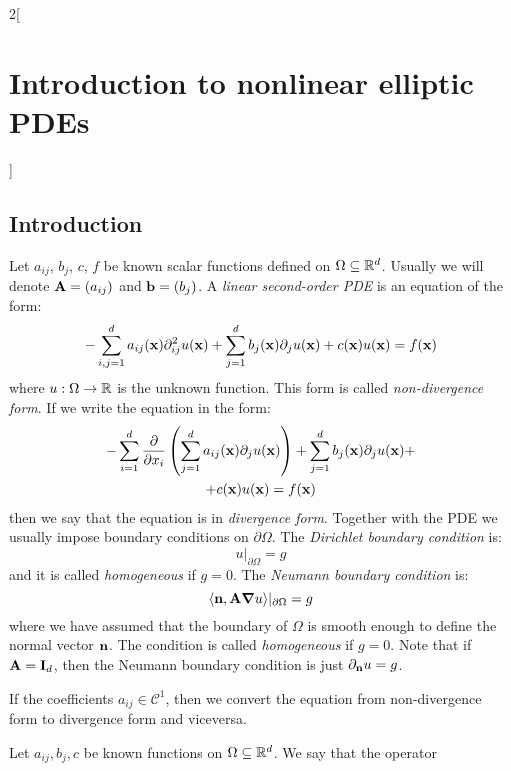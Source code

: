 \documentclass[../../../main_math.tex]{subfiles}
\begin{document}
\begin{multicols}{2}[\section{Introduction to nonlinear elliptic PDEs}]
  \subsection{Introduction}
  \begin{definition}
    Let $a_{ij}$, $b_j$, $c$, $f$ be known scalar functions defined on $\Omega\subseteq \mathbb{R}^d$. Usually we will denote $\boldsymbol{\mathrm{A}}=(a_{ij})$ and $\boldsymbol{\mathrm{b}}=(b_j)$. A \emph{linear second-order PDE} is an equation of the form:
    \begin{equation*}
      -\sum_{i,j=1}^da_{ij}(\boldsymbol{\mathrm{x}})\partial_{ij}^2u(\boldsymbol{\mathrm{x}})+\sum_{j=1}^db_j(\boldsymbol{\mathrm{x}})\partial_ju(\boldsymbol{\mathrm{x}})+c(\boldsymbol{\mathrm{x}})u(\boldsymbol{\mathrm{x}})=f(\boldsymbol{\mathrm{x}})
    \end{equation*}
    where $u:\Omega\to \mathbb{R}$ is the unknown function. This form is called \emph{non-divergence form}. If we write the equation in the form:
    \begin{multline*}
      -\sum_{i=1}^d\pdv{}{x_i}\left(\sum_{j=1}^da_{ij}(\boldsymbol{\mathrm{x}})\partial_ju(\boldsymbol{\mathrm{x}})\right)+\sum_{j=1}^db_j(\boldsymbol{\mathrm{x}})\partial_ju(\boldsymbol{\mathrm{x}})+\\+c(\boldsymbol{\mathrm{x}})u(\boldsymbol{\mathrm{x}})=f(\boldsymbol{\mathrm{x}})
    \end{multline*}
    then we say that the equation is in \emph{divergence form}. Together with the PDE we usually impose boundary conditions on $\partial\Omega$. The \emph{Dirichlet boundary condition} is:
    $$
      u|_{\partial\Omega}=g
    $$
    and it is called \emph{homogeneous} if $g=0$. The \emph{Neumann boundary condition} is:
    $$
      \langle \boldsymbol{\mathrm{n}},\boldsymbol{\mathrm{A}} \grad u\rangle|_{\partial\Omega}=g
    $$
    where we have assumed that the boundary of $\Omega$ is smooth enough to define the normal vector $\boldsymbol{\mathrm{n}}$. The condition is called \emph{homogeneous} if $g=0$. Note that if $\boldsymbol{\mathrm{A}}=\boldsymbol{\mathrm{I}}_d$, then the Neumann boundary condition is just $\partial_{\boldsymbol{\mathrm{n}}} u=g$.
  \end{definition}
  \begin{remark}
    If the coefficients $a_{ij}\in\mathcal{C}^1$, then we convert the equation from non-divergence form to divergence form and viceversa.
  \end{remark}
  \begin{definition}
    Let $a_{ij},b_j,c$ be known functions on $\Omega\subseteq \mathbb{R}^d$. We say that the operator

\end{definition}
\end{multicols}
\end{document}
